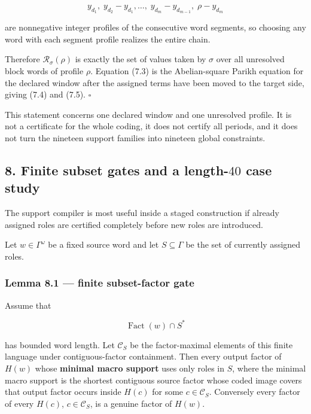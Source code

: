 \documentclass[
  british,
  a4paper,
  11pt]{article}
\begin{document}
\[
y_{d_1},\;
y_{d_2}-y_{d_1},\ldots,\;
y_{d_m}-y_{d_{m-1}},\;
\rho-y_{d_m}
\]

are nonnegative integer profiles of the consecutive word segments, so
choosing any word with each segment profile realizes the entire chain.

Therefore \(\mathcal R_\sigma(\rho)\) is exactly the set of values taken
by \(\sigma\) over all unresolved block words of profile \(\rho\).
Equation (7.3) is the Abelian-square Parikh equation for the declared
window after the assigned terms have been moved to the target side,
giving (7.4) and (7.5). \(\square\)

This statement concerns one declared window and one unresolved profile.
It is not a certificate for the whole coding, it does not certify all
periods, and it does not turn the nineteen support families into
nineteen global constraints.

\subsection{\texorpdfstring{8. Finite subset gates and a length-\(40\)
case
study}{8. Finite subset gates and a length-40 case study}}\label{finite-subset-gates-and-a-length-40-case-study}

The support compiler is most useful inside a staged construction if
already assigned roles are certified completely before new roles are
introduced.

Let \(w\in\Gamma^\omega\) be a fixed source word and let
\(S\subseteq\Gamma\) be the set of currently assigned roles.

\subsubsection{Lemma 8.1 --- finite subset-factor
gate}\label{lemma-8.1-finite-subset-factor-gate}

Assume that

\[
\operatorname{Fact}(w)\cap S^*
\]

has bounded word length. Let \(\mathcal C_S\) be the factor-maximal
elements of this finite language under contiguous-factor containment.
Then every output factor of \(H(w)\) whose \textbf{minimal macro
support} uses only roles in \(S\), where the minimal macro support is
the shortest contiguous source factor whose coded image covers that
output factor occurs inside \(H(c)\) for some \(c\in\mathcal C_S\).
Conversely every factor of every \(H(c)\), \(c\in\mathcal C_S\), is a
genuine factor of \(H(w)\).
\end{document}
